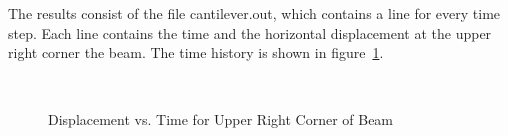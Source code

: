 \documentclass[12pt]{article}
\begin{document}
\vspace{0.2in} 

The results consist of the file cantilever.out, which contains a line for
every time step. 
Each line contains the time and the horizontal
displacement  at the upper right corner the beam.
The time history is shown in
figure~\ref{cantileverdisp}. 

\begin{figure}[h]
\begin{center}
\leavevmode
\hbox{%
\epsfxsize=4.0in
\epsfysize=2.8in
}
\end{center}
\caption{Displacement vs. Time for Upper Right Corner of Beam}
\label{cantileverdisp}
\end{figure}
\end{document}
